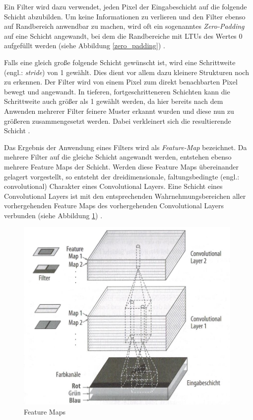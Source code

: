 Ein Filter wird dazu verwendet, jeden Pixel der Eingabeschicht auf die folgende Schicht abzubilden. Um keine Informationen zu verlieren und den Filter ebenso auf Randbereich anwendbar zu machen, wird oft ein sogenanntes \textit{Zero-Padding} auf eine Schicht angewandt, bei dem die Randbereiche mit LTUs des Wertes 0 aufgefüllt werden (siehe Abbildung \ref{zero_padding}) \cite{AurelienGeron.2018}.

Falls eine gleich große folgende Schicht gewünscht ist, wird eine Schrittweite (engl.: \textit{stride}) von 1 gewählt. Dies dient vor allem dazu kleinere Strukturen noch zu erkennen. Der Filter wird von einem Pixel zum direkt benachbarten Pixel bewegt und angewandt. In tieferen, fortgeschritteneren Schichten kann die Schrittweite auch größer als 1 gewählt werden, da hier bereits nach dem Anwenden mehrerer Filter feinere Muster erkannt wurden und diese nun zu größeren zusammengesetzt werden. Dabei verkleinert sich die resultierende Schicht \cite{AurelienGeron.2018}.

Das Ergebnis der Anwendung eines Filters wird als \textit{Feature-Map} bezeichnet. Da mehrere Filter auf die gleiche Schicht angewandt werden, entstehen ebenso mehrere Feature Maps der Schicht. Werden diese Feature Maps übereinander gelagert vorgestellt, so entsteht der dreidimensionale, \glqq faltungsbedingte\grqq{} (engl.: convolutional) Charakter eines Convolutional Layers. Eine Schicht eines Convolutional Layers ist mit den entsprechenden Wahrnehmungsbereichen aller vorhergehenden Feature Maps des vorhergehenden Convolutional Layers verbunden (siehe Abbildung \ref{feature_maps}) \cite{AurelienGeron.2018}.

\begin{figure}[ht]
	\begin{center}
		\includegraphics[width=11cm]{Bilder/feature_maps.jpeg} 
		\caption[Feature Maps]{Feature Maps \cite{AurelienGeron.2018}}
		\label{feature_maps}
	\end{center}
\end{figure}

